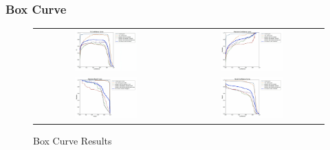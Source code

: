 \begin{refsection}
\subsubsection{Box Curve}
\begin{figure}[H]
\centering
\begin{tabular}{cc}
\includegraphics[width=0.45\textwidth]{figures/Fig18a.jpg} &
\includegraphics[width=0.45\textwidth]{figures/Fig18b.jpg} \\
\includegraphics[width=0.45\textwidth]{figures/Fig18c.jpg} &
\includegraphics[width=0.45\textwidth]{figures/Fig18d.jpg} \\
\end{tabular}
\caption{Box Curve Results}
\label{fig:box_curve}
\end{figure}


\end{refsection}
